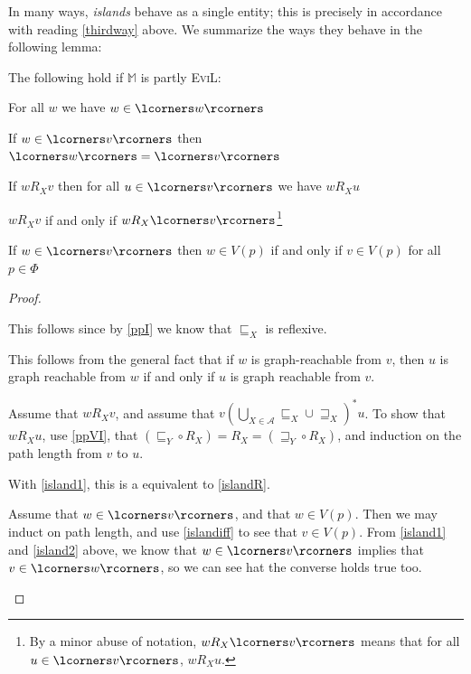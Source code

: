 In many ways, \emph{islands} behave as a single entity;  this is
precisely in accordance with reading \ref{thirdway} above.
We summarize the ways they behave in the following lemma:
\begin{lemma}\label{island}
The following hold if $\mathbb{M}$ is partly \textsc{EviL}:
\begin{mynum}
	\item\label{island1} For all $w$ we have $w \in \lcorners w\rcorners$
	\item\label{island2} If $w \in \lcorners v\rcorners$ then $\lcorners w\rcorners = \lcorners v\rcorners$
	\item \label{islandR} If $w R_X v$ then for all $u \in \lcorners v\rcorners$
          we have $w R_X u$
\item \label{islandR2} $w R_X v$ if and only if $w R_X \lcorners v
  \rcorners$\footnote{By a minor abuse of notation, 
 $w R_X \lcorners
     v\rcorners$ means that for all $u \in \lcorners v \rcorners$, $w
     R_X u$.
}
	\item \label{islandletters} If $w \in \lcorners v\rcorners$ then $w\in V(p)$ if and only if $v \in V(p)$ for all $p \in \Phi$
\end{mynum}
\end{lemma}
\begin{proof} \ \\
\begin{mynum}
\item This follows since by \ref{ppI} we know that $\sqsubseteq_X$ is
  reflexive.
\item This follows from the general fact that if $w$ is graph-reachable from
  $v$, then $u$ is graph reachable from $w$ if and only if $u$ is
  graph reachable from $v$.
\item Assume that $w R_X v$, and assume that $v \left(\bigcup_{X \in
      \mathcal{A}} \sqsubseteq_X \cup \sqsupseteq_X \right)^\ast u$.
  To show that $w R_X u$, use \ref{ppVI}, that $(\sqsubseteq_Y \circ R_X) = R_X =
    (\sqsupseteq_Y \circ R_X)$, and induction on the path length from
    $v$ to $u$.
\item With \ref{island1}, this is a equivalent to \ref{islandR}.
\item Assume that $w \in \lcorners v \rcorners$, and that $w \in
  V(p)$.  Then we may induct on path length, and use \ref{islandiff}
  to see that $v \in V(p)$.  From \ref{island1} and \ref{island2}
  above, we know that $w \in \lcorners v \rcorners$ implies that $v
  \in \lcorners w \rcorners$, so we can see hat the converse holds
  true too.
\end{mynum}
\end{proof}

